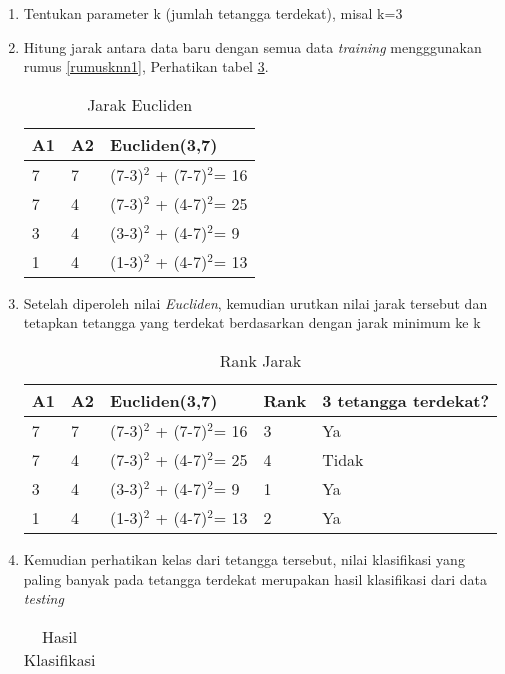 \begin{enumerate}
    \item Tentukan parameter k (jumlah tetangga terdekat), misal k=3
    \item Hitung jarak antara data baru dengan semua data \textit{training} mengggunakan rumus \ref{rumusknn1}, Perhatikan tabel \ref{knn3}.
    \begin{table}[!ht]
    \centering
    \caption{Jarak Eucliden}
    \label{knn3}
\begin{tabular}{|l|l|l|}
\hline
A1 & A2 & Eucliden(3,7)               \\ \hline
7  & 7  & (7-3)$^{2}$ + (7-7)$^{2}$= 16 \\ \hline
7  & 4  & (7-3)$^{2}$ + (4-7)$^{2}$= 25 \\ \hline
3  & 4  & (3-3)$^{2}$ + (4-7)$^{2}$= 9 \\ \hline
1  & 4  & (1-3)$^{2}$ + (4-7)$^{2}$= 13 \\ \hline
\end{tabular}
\end{table}
\item Setelah diperoleh nilai \textit{Eucliden}, kemudian urutkan nilai jarak tersebut dan tetapkan tetangga yang terdekat berdasarkan dengan jarak minimum ke k
\begin{table}[!ht]
    \centering
    \caption{Rank Jarak}
    \label{knn3}
\begin{tabular}{|l|l|l|l|l|}
\hline
A1 & A2 & Eucliden(3,7)               & Rank & 3 tetangga terdekat? \\ \hline
7  & 7  & (7-3)$^{2}$ + (7-7)$^{2}$= 16 & 3    & Ya                   \\ \hline
7  & 4  & (7-3)$^{2}$ + (4-7)$^{2}$= 25 & 4    & Tidak                \\ \hline
3  & 4  & (3-3)$^{2}$ + (4-7)$^{2}$= 9  & 1    & Ya                   \\ \hline
1  & 4  & (1-3)$^{2}$ + (4-7)$^{2}$= 13 & 2    & Ya                   \\ \hline
\end{tabular}
\end{table}
\pagebreak
\item Kemudian perhatikan kelas dari tetangga tersebut, nilai klasifikasi yang paling banyak pada tetangga terdekat merupakan hasil klasifikasi dari data \textit{testing}
\begin{table}[!ht]
    \centering
    \caption{Hasil Klasifikasi}
    \label{knn3}
\begin{tabular}{|l|l|l|l|l|l|}

\end{tabular}
\end{table}
\end{enumerate}
